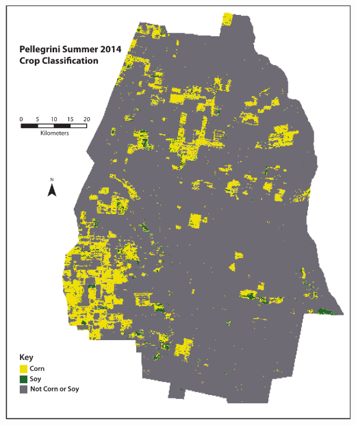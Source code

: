 \begin{ssfigure}
  \centering
  \includegraphics[width=\textwidth]{Graphics/ARclassed.pdf}
  \caption[Pellegrini Summer 2014 Classification]{}
  \label{map:ARclassification}
\end{ssfigure}